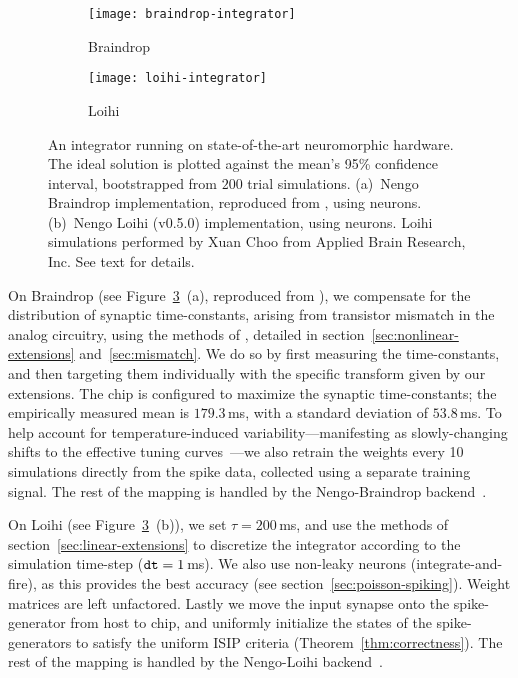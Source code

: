 \begin{figure}
  \centering
  \begin{subfigure}{.5\textwidth}
    \centering
    \texttt{[image: braindrop-integrator]}
    \caption{Braindrop}
    \label{fig:braindrop-integrator}
  \end{subfigure}%
  \begin{subfigure}{.5\textwidth}
    \centering
    \texttt{[image: loihi-integrator]}
    \caption{Loihi}
    \label{fig:loihi-integrator}
  \end{subfigure}
  \caption[Dynamical integration on Braindrop and Loihi.]{
    An integrator running on state-of-the-art neuromorphic hardware.
    The ideal solution is plotted against the mean's 95\% confidence interval, bootstrapped from $200$ trial simulations.
    (a)~Nengo Braindrop implementation, reproduced from \citet[][Figure~15]{braindrop2019}, using  neurons. 
    (b)~Nengo Loihi (v0.5.0) implementation, using  neurons.
    Loihi simulations performed by Xuan Choo from Applied Brain Research, Inc.
    See text for details.
  }\label{fig:integrator-neuromorphic}
\end{figure}

On Braindrop (see Figure~\ref{fig:integrator-neuromorphic}~(a), reproduced from \citet[][Figure~15]{braindrop2019}), we compensate for the distribution of synaptic time-constants, arising from transistor mismatch in the analog circuitry, using the methods of \citet{voelker2017iscas}, detailed in section~\ref{sec:nonlinear-extensions} and~\ref{sec:mismatch}.
We do so by first measuring the time-constants, and then targeting them individually with the specific transform given by our extensions.
The chip is configured to maximize the synaptic time-constants; the empirically measured mean is $179.3$\,ms, with a standard deviation of $53.8$\,ms.
To help account for temperature-induced variability---manifesting as slowly-changing shifts to the effective tuning curves~\citep{abrams2017}---we also retrain the weights every 10 simulations directly from the spike data, collected using a separate training signal.
The rest of the mapping is handled by the Nengo-Braindrop backend~\citep{neckar2018optimizing, braindrop2019}.

On Loihi (see Figure~\ref{fig:integrator-neuromorphic}~(b)), we set $\tau = 200$\,ms, and use the methods of section~\ref{sec:linear-extensions} to discretize the integrator according to the simulation time-step ($\texttt{dt}{} = 1$\,ms).
We also use non-leaky neurons (integrate-and-fire), as this provides the best accuracy (see section~\ref{sec:poisson-spiking}).
Weight matrices are left unfactored.
Lastly we move the input synapse onto the spike-generator from host to chip, and uniformly initialize the states of the spike-generators to satisfy the uniform ISIP criteria (Theorem~\ref{thm:correctness}).
The rest of the mapping is handled by the Nengo-Loihi backend~\citep{nengoloihi}.

